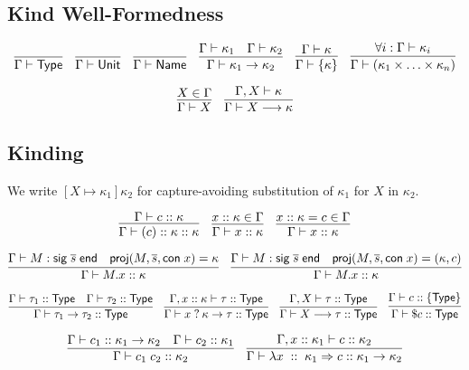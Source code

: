 \documentclass{article}
\newcommand{\mt}[1]{\mathsf{#1}}
\begin{document}
\subsection{Kind Well-Formedness}

$$\infer{\Gamma \vdash \mt{Type}}{}
\quad \infer{\Gamma \vdash \mt{Unit}}{}
\quad \infer{\Gamma \vdash \mt{Name}}{}
\quad \infer{\Gamma \vdash \kappa_1 \to \kappa_2}{
  \Gamma \vdash \kappa_1
  & \Gamma \vdash \kappa_2
}
\quad \infer{\Gamma \vdash \{\kappa\}}{
  \Gamma \vdash \kappa
}
\quad \infer{\Gamma \vdash (\kappa_1 \times \ldots \times \kappa_n)}{
  \forall i: \Gamma \vdash \kappa_i
}$$

$$\infer{\Gamma \vdash X}{
  X \in \Gamma
}
\quad \infer{\Gamma \vdash X \longrightarrow \kappa}{
  \Gamma, X \vdash \kappa
}$$

\subsection{Kinding}

We write $[X \mapsto \kappa_1]\kappa_2$ for capture-avoiding substitution of $\kappa_1$ for $X$ in $\kappa_2$.

$$\infer{\Gamma \vdash (c) :: \kappa :: \kappa}{
  \Gamma \vdash c :: \kappa
}
\quad \infer{\Gamma \vdash x :: \kappa}{
  x :: \kappa \in \Gamma
}
\quad \infer{\Gamma \vdash x :: \kappa}{
  x :: \kappa = c \in \Gamma
}$$

$$\infer{\Gamma \vdash M.x :: \kappa}{
  \Gamma \vdash M : \mt{sig} \; \overline{s} \; \mt{end}
  & \mt{proj}(M, \overline{s}, \mt{con} \; x) = \kappa
}
\quad \infer{\Gamma \vdash M.x :: \kappa}{
  \Gamma \vdash M : \mt{sig} \; \overline{s} \; \mt{end}
  & \mt{proj}(M, \overline{s}, \mt{con} \; x) = (\kappa, c)
}$$

$$\infer{\Gamma \vdash \tau_1 \to \tau_2 :: \mt{Type}}{
  \Gamma \vdash \tau_1 :: \mt{Type}
  & \Gamma \vdash \tau_2 :: \mt{Type}
}
\quad \infer{\Gamma \vdash x \; ? \: \kappa \to \tau :: \mt{Type}}{
  \Gamma, x :: \kappa \vdash \tau :: \mt{Type}
}
\quad \infer{\Gamma \vdash X \longrightarrow \tau :: \mt{Type}}{
  \Gamma, X \vdash \tau :: \mt{Type}
}
\quad \infer{\Gamma \vdash \$c :: \mt{Type}}{
  \Gamma \vdash c :: \{\mt{Type}\}
}$$

$$\infer{\Gamma \vdash c_1 \; c_2 :: \kappa_2}{
  \Gamma \vdash c_1 :: \kappa_1 \to \kappa_2
  & \Gamma \vdash c_2 :: \kappa_1
}
\quad \infer{\Gamma \vdash \lambda x \; :: \; \kappa_1 \Rightarrow c :: \kappa_1 \to \kappa_2}{
  \Gamma, x :: \kappa_1 \vdash c :: \kappa_2
}$$
\end{document}
